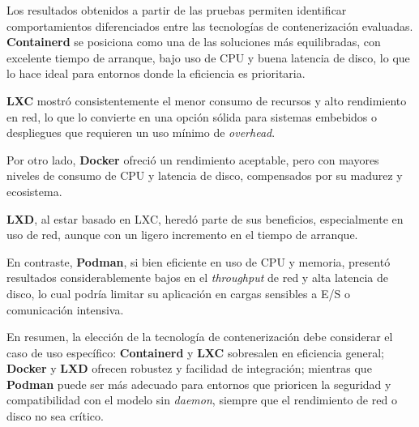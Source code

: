 Los resultados obtenidos a partir de las pruebas permiten identificar comportamientos diferenciados entre las tecnologías de contenerización evaluadas. \textbf{Containerd} se posiciona como una de las soluciones más equilibradas, con excelente tiempo de arranque, bajo uso de CPU y buena latencia de disco, lo que lo hace ideal para entornos donde la eficiencia es prioritaria.

\textbf{LXC} mostró consistentemente el menor consumo de recursos y alto rendimiento en red, lo que lo convierte en una opción sólida para sistemas embebidos o despliegues que requieren un uso mínimo de \textit{overhead}. 

Por otro lado, \textbf{Docker} ofreció un rendimiento aceptable, pero con mayores niveles de consumo de CPU y latencia de disco, compensados por su madurez y ecosistema. 

\textbf{LXD}, al estar basado en LXC, heredó parte de sus beneficios, especialmente en uso de red, aunque con un ligero incremento en el tiempo de arranque. 

En contraste, \textbf{Podman}, si bien eficiente en uso de CPU y memoria, presentó resultados considerablemente bajos en el \textit{throughput} de red y alta latencia de disco, lo cual podría limitar su aplicación en cargas sensibles a E/S o comunicación intensiva.

\vspace{0.5em}

\noindent En resumen, la elección de la tecnología de contenerización debe considerar el caso de uso específico: \textbf{Containerd} y \textbf{LXC} sobresalen en eficiencia general; \textbf{Docker} y \textbf{LXD} ofrecen robustez y facilidad de integración; mientras que \textbf{Podman} puede ser más adecuado para entornos que prioricen la seguridad y compatibilidad con el modelo sin \textit{daemon}, siempre que el rendimiento de red o disco no sea crítico.
